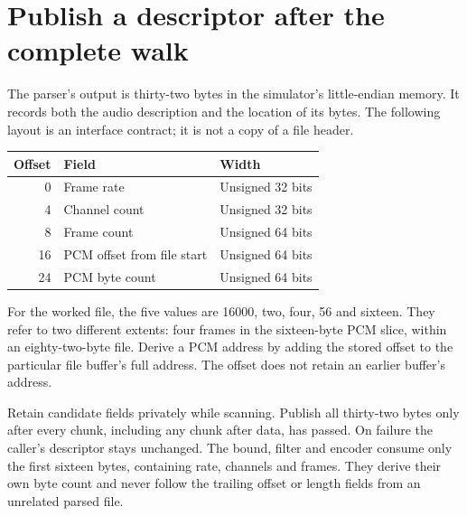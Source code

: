 \section{Publish a descriptor after the complete walk}
The parser's output is thirty-two bytes in the simulator's little-endian memory.
It records both the audio description and the location of its bytes. The following
layout is an interface contract; it is not a copy of a file header.

\begin{center}
\begin{tabular}{rll}
Offset & Field & Width \\
\hline
0 & Frame rate & Unsigned 32 bits \\
4 & Channel count & Unsigned 32 bits \\
8 & Frame count & Unsigned 64 bits \\
16 & PCM offset from file start & Unsigned 64 bits \\
24 & PCM byte count & Unsigned 64 bits \\
\end{tabular}
\end{center}

For the worked file, the five values are 16000, two, four, 56 and sixteen. They refer
to two different extents: four frames in the sixteen-byte PCM slice, within an
eighty-two-byte file. Derive a PCM address by adding the stored offset to the particular
file buffer's full address. The offset does not retain an earlier buffer's address.

Retain candidate fields privately while scanning. Publish all thirty-two bytes only
after every chunk, including any chunk after data, has passed. On failure the caller's
descriptor stays unchanged. The bound, filter and encoder consume only the first
sixteen bytes, containing rate, channels and frames. They derive their own byte count
and never follow the trailing offset or length fields from an unrelated parsed file.

